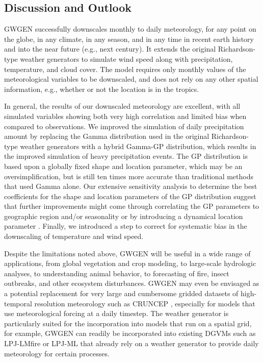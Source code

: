 \begin{refsection}
\section{Discussion and Outlook} \label{sec:discussion}
GWGEN successfully downscales monthly to daily meteorology, for any point on the globe, in any climate, in any season, and in any time in recent earth history and into the near future (e.g., next century). It extends the original Richardson-type weather generators to simulate wind speed along with precipitation, temperature, and cloud cover. The model requires only monthly values of the meteorological variables to be downscaled, and does not rely on any other spatial information, e.g., whether or not the location is in the tropics.

In general, the results of our downscaled meteorology are excellent, with all simulated variables showing both very high correlation and limited bias when compared to observations. We improved the simulation of daily precipitation amount by replacing the Gamma distribution used in the original Richardson-type weather generators with a hybrid Gamma-GP distribution, which results in the improved simulation of heavy precipitation events. The GP distribution is based upon a globally fixed shape and location parameter, which may be an oversimplification, but is still ten times more accurate than traditional methods that used Gamma alone. Our extensive sensitivity analysis to determine the best coefficients for the shape and location parameters of the GP distribution suggest that further improvements might come through correlating the GP parameters to geographic region and/or seasonality \citep{MaraunRustOsborn2009,RustMaraunOsborn2009} or by introducing a dynamical location parameter \citep{FrigessiHaugRue2002}. Finally, we introduced a step to correct for systematic bias in the downscaling of temperature and wind speed.

Despite the limitations noted above, GWGEN will be useful in a wide range of applications, from global vegetation and crop modeling, to large-scale hydrologic analyses, to understanding animal behavior, to forecasting of fire, insect outbreaks, and other ecosystem disturbances. GWGEN may even be envisaged as a potential replacement for very large and cumbersome gridded datasets of high-temporal resolution meteorology such as CRUNCEP \citep{ViovyCiais2016}, especially for models that use meteorological forcing at a daily timestep. The weather generator is particularly suited for the incorporation into models that run on a spatial grid, for example, GWGEN can readily be incorporated into existing DGVMs such as LPJ-LMfire \citep{PfeifferSpessaKaplan2013} or LPJ-ML \citep{BondeauSmithZaehleEtAl2007} that already rely on a weather generator to provide daily meteorology for certain processes. 


\end{refsection}
